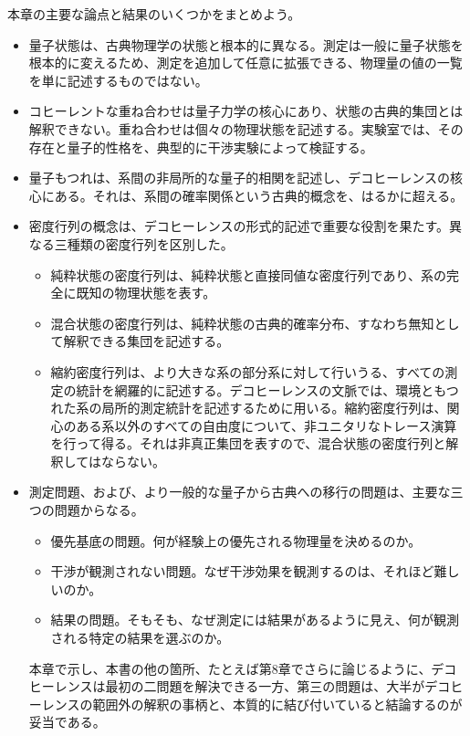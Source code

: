 

本章の主要な論点と結果のいくつかをまとめよう。
\begin{itemize}
\item 量子状態は、古典物理学の状態と根本的に異なる。測定は一般に量子状態を根本的に変えるため、測定を追加して任意に拡張できる、物理量の値の一覧を単に記述するものではない。
\item コヒーレントな重ね合わせは量子力学の核心にあり、状態の古典的集団とは解釈できない。重ね合わせは個々の物理状態を記述する。実験室では、その存在と量子的性格を、典型的に干渉実験によって検証する。
\item 量子もつれは、系間の非局所的な量子的相関を記述し、デコヒーレンスの核心にある。それは、系間の確率関係という古典的概念を、はるかに超える。
\item 密度行列の概念は、デコヒーレンスの形式的記述で重要な役割を果たす。異なる三種類の密度行列を区別した。
\begin{itemize}
\item 純粋状態の密度行列は、純粋状態と直接同値な密度行列であり、系の完全に既知の物理状態を表す。
\item 混合状態の密度行列は、純粋状態の古典的確率分布、すなわち無知として解釈できる集団を記述する。
\item 縮約密度行列は、より大きな系の部分系に対して行いうる、すべての測定の統計を網羅的に記述する。デコヒーレンスの文脈では、環境ともつれた系の局所的測定統計を記述するために用いる。縮約密度行列は、関心のある系以外のすべての自由度について、非ユニタリなトレース演算を行って得る。それは非真正集団を表すので、混合状態の密度行列と解釈してはならない。
\end{itemize}
\item 測定問題、および、より一般的な量子から古典への移行の問題は、主要な三つの問題からなる。
\begin{itemize}
\item 優先基底の問題。何が経験上の優先される物理量を決めるのか。
\hypertarget{srcpage:113}{}\label{srcpage:113}
\item 干渉が観測されない問題。なぜ干渉効果を観測するのは、それほど難しいのか。
\item 結果の問題。そもそも、なぜ測定には結果があるように見え、何が観測される特定の結果を選ぶのか。
\end{itemize}
本章で示し、本書の他の箇所、たとえば第8章でさらに論じるように、デコヒーレンスは最初の二問題を解決できる一方、第三の問題は、大半がデコヒーレンスの範囲外の解釈の事柄と、本質的に結び付いていると結論するのが妥当である。

\end{itemize}
